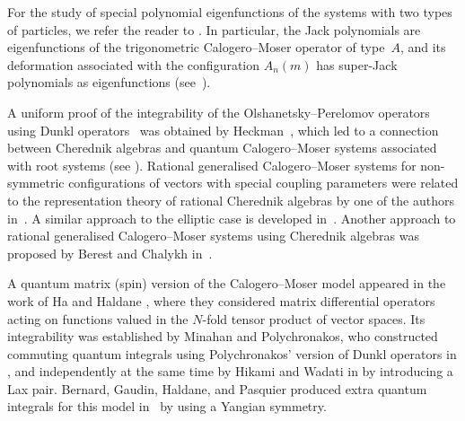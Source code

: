 \documentclass[12pt]{amsart}
\numberwithin{equation}{section}
\theoremstyle{definition}
\begin{document}
  
  
  For the study of special polynomial eigenfunctions of the systems with two types of particles,
  we refer the reader to \cite{Sergeev, SV'05, SV'09, HL, AHL, Feigin1, Hallnas}. In particular, the Jack polynomials are eigenfunctions of the trigonometric Calogero--Moser operator of type~$A$, and its deformation associated with the configuration $A_n(m)$ has super-Jack polynomials as eigenfunctions (see~\cite{Sergeev}).

A uniform proof of the integrability of the Olshanetsky--Perelomov operators using Dunkl operators~\cite{Dunkl} was obtained by Heckman~\cite{Heckman, HeckmanTrig}, which led to a connection between Cherednik algebras and quantum Calogero--Moser systems associated with root systems (see \cite{Et}). Rational generalised Calogero--Moser systems for non-symmetric configurations of vectors with special coupling parameters were related to the representation theory of rational Cherednik algebras by one of the authors in~\cite{Feigin}. A similar approach to the elliptic case is developed in~\cite{FS}.
Another approach to rational generalised Calogero--Moser systems using Cherednik algebras was proposed by Berest and Chalykh in~\cite{BC}. %

A quantum matrix (spin) version of the Calogero--Moser model appeared in the work of Ha and Haldane \cite{HH}, where they considered matrix differential operators acting on functions valued in the $N$-fold tensor product of vector spaces. Its integrability was established by Minahan and Polychronakos, 
who constructed commuting quantum integrals 
using Polychronakos' version of Dunkl operators in \cite{MP}, and independently at the same time by Hikami and Wadati in \cite{HW} by introducing a Lax pair. 
Bernard, Gaudin, Haldane, and Pasquier produced extra quantum integrals for this model in~\cite{BAB} by using a Yangian symmetry. 
\end{document}
